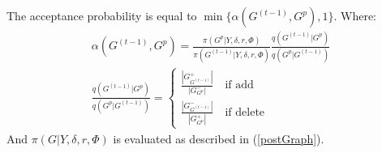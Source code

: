 The acceptance probability is equal to $\min\{\alpha(G^{(t-1)}, G^p),1\}$. Where:
\begin{equation*}
    \begin{gathered}
       \alpha(G^{(t-1)}, G^p) = \frac{\pi(G^p| Y, \delta,r, \Phi)}{\pi(G^{(t-1)}| Y, \delta,r, \Phi)} \frac{q(G^{(t-1)}|G^p)}{q(G^p|G^{(t-1)})}\\
       \frac{q(G^{(t-1)}|G^p)}{q(G^p|G^{(t-1)})} = \begin{cases}
           \frac{|G_{G^{(t-1)}}^+|}{|G_{G^p}^{-}|} \quad \text{if add}\\
           \frac{|G^{-}_{G^{(t-1)}}|}{|G_{G^p}^+|} \quad \text{if delete}
       \end{cases}
    \end{gathered}
\end{equation*}
And $\pi(G|Y,\delta,r,\Phi)$ is evaluated as described in (\ref{postGraph}). \\

